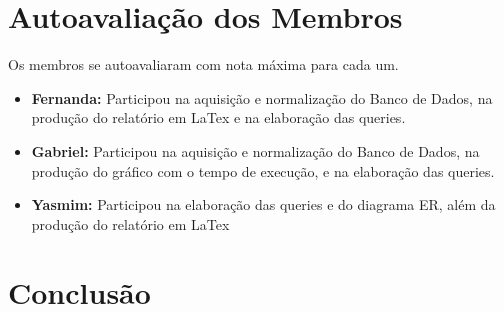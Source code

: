 \documentclass{article}
\begin{document}
\section{Autoavaliação dos Membros}
Os membros se autoavaliaram com nota máxima para cada um.
\begin{itemize}
\item \textbf{Fernanda:} Participou na aquisição e normalização do Banco de Dados, na produção do relatório em LaTex e na elaboração das queries.
\item \textbf{Gabriel:} Participou na aquisição e normalização do Banco de Dados, na produção do gráfico com o tempo de execução, e na elaboração das queries.
\item \textbf{Yasmim:} Participou na elaboração das queries e do diagrama ER, além da produção do relatório em LaTex
\end{itemize}
\section{Conclusão}



\end{document}

